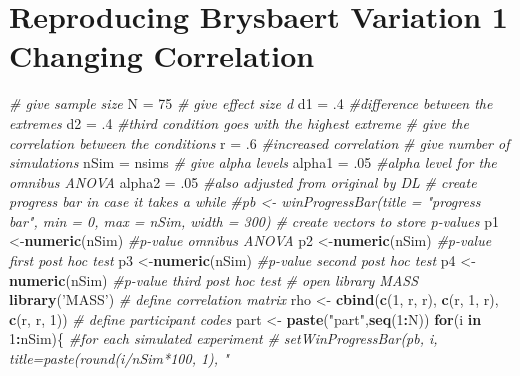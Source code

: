 \documentclass[]{book}
\newenvironment{Shaded}{\begin{snugshade}}{\end{snugshade}}
\newcommand{\CommentTok}[1]{\textcolor[rgb]{0.56,0.35,0.01}{\textit{#1}}}
\newcommand{\ControlFlowTok}[1]{\textcolor[rgb]{0.13,0.29,0.53}{\textbf{#1}}}
\newcommand{\DecValTok}[1]{\textcolor[rgb]{0.00,0.00,0.81}{#1}}
\newcommand{\FloatTok}[1]{\textcolor[rgb]{0.00,0.00,0.81}{#1}}
\newcommand{\KeywordTok}[1]{\textcolor[rgb]{0.13,0.29,0.53}{\textbf{#1}}}
\newcommand{\NormalTok}[1]{#1}
\newcommand{\OperatorTok}[1]{\textcolor[rgb]{0.81,0.36,0.00}{\textbf{#1}}}
\newcommand{\StringTok}[1]{\textcolor[rgb]{0.31,0.60,0.02}{#1}}
\begin{document}
\hypertarget{reproducing-brysbaert-variation-1-changing-correlation}{%
\section{Reproducing Brysbaert Variation 1 Changing Correlation}\label{reproducing-brysbaert-variation-1-changing-correlation}}

\begin{Shaded}
\begin{Highlighting}[]
\CommentTok{# give sample size}
\NormalTok{N =}\StringTok{ }\DecValTok{75}
\CommentTok{# give effect size d}
\NormalTok{d1 =}\StringTok{ }\FloatTok{.4} \CommentTok{#difference between the extremes}
\NormalTok{d2 =}\StringTok{ }\FloatTok{.4} \CommentTok{#third condition goes with the highest extreme}
\CommentTok{# give the correlation between the conditions}
\NormalTok{r =}\StringTok{ }\FloatTok{.6} \CommentTok{#increased correlation}
\CommentTok{# give number of simulations}
\NormalTok{nSim =}\StringTok{ }\NormalTok{nsims}
\CommentTok{# give alpha levels}
\NormalTok{alpha1 =}\StringTok{ }\FloatTok{.05} \CommentTok{#alpha level for the omnibus ANOVA}
\NormalTok{alpha2 =}\StringTok{ }\FloatTok{.05} \CommentTok{#also adjusted from original by DL}
\CommentTok{# create progress bar in case it takes a while}
\CommentTok{#pb <- winProgressBar(title = "progress bar", min = 0, max = nSim, width = 300)}
\CommentTok{# create vectors to store p-values}
\NormalTok{p1 <-}\KeywordTok{numeric}\NormalTok{(nSim) }\CommentTok{#p-value omnibus ANOVA}
\NormalTok{p2 <-}\KeywordTok{numeric}\NormalTok{(nSim) }\CommentTok{#p-value first post hoc test}
\NormalTok{p3 <-}\KeywordTok{numeric}\NormalTok{(nSim) }\CommentTok{#p-value second post hoc test}
\NormalTok{p4 <-}\KeywordTok{numeric}\NormalTok{(nSim) }\CommentTok{#p-value third post hoc test}
\CommentTok{# open library MASS}
\KeywordTok{library}\NormalTok{(}\StringTok{'MASS'}\NormalTok{)}
\CommentTok{# define correlation matrix}
\NormalTok{rho <-}\StringTok{ }\KeywordTok{cbind}\NormalTok{(}\KeywordTok{c}\NormalTok{(}\DecValTok{1}\NormalTok{, r, r), }\KeywordTok{c}\NormalTok{(r, }\DecValTok{1}\NormalTok{, r), }\KeywordTok{c}\NormalTok{(r, r, }\DecValTok{1}\NormalTok{))}
\CommentTok{# define participant codes}
\NormalTok{part <-}\StringTok{ }\KeywordTok{paste}\NormalTok{(}\StringTok{"part"}\NormalTok{,}\KeywordTok{seq}\NormalTok{(}\DecValTok{1}\OperatorTok{:}\NormalTok{N))}
\ControlFlowTok{for}\NormalTok{(i }\ControlFlowTok{in} \DecValTok{1}\OperatorTok{:}\NormalTok{nSim)\{ }\CommentTok{#for each simulated experiment}
 \CommentTok{# setWinProgressBar(pb, i, title=paste(round(i/nSim*100, 1), "%
}
\end{Highlighting}
\end{Shaded}
\end{document}
